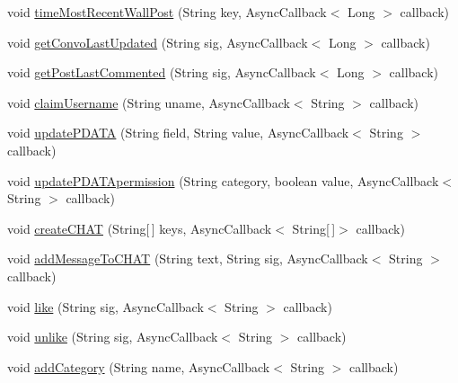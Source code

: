 \begin{DoxyCompactItemize}
\item 
void \hyperlink{interfaceballmerpeak_1_1turtlenet_1_1client_1_1TurtlenetAsync_a7c5cf7164c931cc259f2f3d536e4a5b6}{time\-Most\-Recent\-Wall\-Post} (String key, Async\-Callback$<$ Long $>$ callback)
\item 
void \hyperlink{interfaceballmerpeak_1_1turtlenet_1_1client_1_1TurtlenetAsync_aeea4d58517cb71624be15cec8b0510de}{get\-Convo\-Last\-Updated} (String sig, Async\-Callback$<$ Long $>$ callback)
\item 
void \hyperlink{interfaceballmerpeak_1_1turtlenet_1_1client_1_1TurtlenetAsync_a834d3273d3a41654fdb00ba979ff150b}{get\-Post\-Last\-Commented} (String sig, Async\-Callback$<$ Long $>$ callback)
\item 
void \hyperlink{interfaceballmerpeak_1_1turtlenet_1_1client_1_1TurtlenetAsync_a1069bf6f78fede8e4f78a2f2e39df27d}{claim\-Username} (String uname, Async\-Callback$<$ String $>$ callback)
\item 
void \hyperlink{interfaceballmerpeak_1_1turtlenet_1_1client_1_1TurtlenetAsync_a7a7cbb0b042da41c7eeadd290b42a35d}{update\-P\-D\-A\-T\-A} (String field, String value, Async\-Callback$<$ String $>$ callback)
\item 
void \hyperlink{interfaceballmerpeak_1_1turtlenet_1_1client_1_1TurtlenetAsync_a148056124adb3370e75cafef6f938775}{update\-P\-D\-A\-T\-Apermission} (String category, boolean value, Async\-Callback$<$ String $>$ callback)
\item 
void \hyperlink{interfaceballmerpeak_1_1turtlenet_1_1client_1_1TurtlenetAsync_a107ee449c88dfac657425fdb5933ba93}{create\-C\-H\-A\-T} (String\mbox{[}$\,$\mbox{]} keys, Async\-Callback$<$ String\mbox{[}$\,$\mbox{]}$>$ callback)
\item 
void \hyperlink{interfaceballmerpeak_1_1turtlenet_1_1client_1_1TurtlenetAsync_ad476065edadd8a0adf43a634d89c3ae0}{add\-Message\-To\-C\-H\-A\-T} (String text, String sig, Async\-Callback$<$ String $>$ callback)
\item 
void \hyperlink{interfaceballmerpeak_1_1turtlenet_1_1client_1_1TurtlenetAsync_a43ea6e283792f49da2130d82e2e97d21}{like} (String sig, Async\-Callback$<$ String $>$ callback)
\item 
void \hyperlink{interfaceballmerpeak_1_1turtlenet_1_1client_1_1TurtlenetAsync_adf69c36b9b3c38a741edf28b3b64792f}{unlike} (String sig, Async\-Callback$<$ String $>$ callback)
\item 
void \hyperlink{interfaceballmerpeak_1_1turtlenet_1_1client_1_1TurtlenetAsync_a10e4779298723a1ba9e00664b0d8246a}{add\-Category} (String name, Async\-Callback$<$ String $>$ callback)

\end{DoxyCompactItemize}
